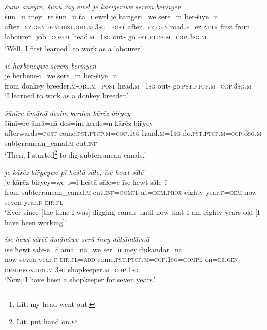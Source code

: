 \ea \label{ŽM.4}
\textit{šūnū āneyre, šūnū řāy eweɫ je kārīgerīwe serem beršīyen} \\ 
\gll šūn=ū āney=re šūn=ū řā=ī eweɫ je kārīgerī=we sere=m ber-šīye=n \\ 
 after\textsc{=ez.gen} \textsc{dem.dist}\textsc{.obl}\textsc{.m}\textsc{.3sg}\textsc{=\textsc{post}} after\textsc{=ez.gen} road\textsc{.f}=ez.\textsc{attr} first from labourer\_job\textsc{=compl} head\textsc{.m}\textsc{=\textsc{1sg}} out- go\textsc{.pst}\textsc{.ptcp}\textsc{.m}\textsc{=cop}\textsc{.3sg}\textsc{.m} \\ 
\glt `Well, I first learned\footnote{Lit. my head went out.}  to work as a labourer.'
\z 
 
\ea \label{ŽM.5}
\textit{je herbeneywe serem beršīyen} \\ 
\gll je herbene-ī=we sere=m ber-šīye=n \\ 
 from donkey breeder\textsc{.m}\textsc{-obl}\textsc{.m}\textsc{=\textsc{post}} head\textsc{.m}\textsc{=\textsc{1sg}} out- go\textsc{.pst}\textsc{.ptcp}\textsc{.m}\textsc{=cop}\textsc{.3sg}\textsc{.m} \\ 
\glt `I learned to work as a donkey breeder.'
\z 
 
\ea \label{ŽM.6}
\textit{šūnīre āmānā desim kerđen kārēz biřyey} \\ 
\gll šūnī=re āmā=nā des=im kerđe=n kārēz biřyey \\ 
 afterwards\textsc{=\textsc{post}} come\textsc{.pst}\textsc{.ptcp}\textsc{.m}\textsc{=cop}\textsc{.\textsc{1sg}} hand\textsc{.m}\textsc{=\textsc{1sg}} do\textsc{.pst}\textsc{.ptcp}\textsc{.m}\textsc{=cop}\textsc{.3sg}\textsc{.m} subterranean\_canal\textsc{.m} cut\textsc{.inf} \\ 
\glt `Then, I started\footnote{Lit. put hand on.} to dig subterranean canals.'
\z 
 
\ea \label{ŽM.7}
\textit{je kārēz biřyeywe pī heštā sāɫe, īse ħewt sāɫē} \\ 
\gll je kārēz biřyey=we p=ī heštā sāɫe=e īse ħewt sāɫe-ē \\ 
 from subterranean\_canal\textsc{.m} cut\textsc{.inf}\textsc{=compl} at=\textsc{dem.prox} eighty year\textsc{.f}\textsc{=dem} now seven year\textsc{.f}\textsc{-dir}\textsc{.pl} \\ 
\glt `Ever since [the time I was] digging canals until now that I am eighty years old [I have been working]'
\z 
 
\ea \label{ŽM.8}
\textit{īse ħewt sāɫēč āmānāwe serū īney dūkāndārnā} \\ 
\gll īse ħewt sāɫe-ē=č āmā=nā=we ser=ū īney dūkāndār=nā \\ 
 now seven year\textsc{.f}\textsc{-dir}\textsc{.pl}\textsc{=add} come\textsc{.pst}\textsc{.ptcp}\textsc{.m}\textsc{=cop}\textsc{.\textsc{1sg}}\textsc{=compl} on\textsc{=ez.gen} \textsc{dem.prox}\textsc{.obl}\textsc{.m}\textsc{.3sg} shopkeeper\textsc{.m}\textsc{=cop}\textsc{.\textsc{1sg}} \\ 
\glt `Now, I have been a shopkeeper for seven years.'
\z 
 
